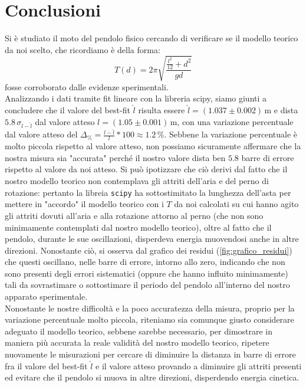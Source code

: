 \documentclass{article}
\begin{document}
\section{Conclusioni}
Si è studiato il moto del pendolo fisico cercando di verificare se il modello teorico da noi scelto, che ricordiamo è della forma:
$$
	T(d) = 2\pi\sqrt{\frac{\frac{l^2}{12} + d^2}{gd}}
$$
fosse corroborato dalle evidenze sperimentali. \\
Analizzando i dati tramite fit lineare con la libreria scipy, siamo giunti a concludere che il valore del best-fit $\hat{l}$ risulta essere $\hat{l} = (1.037 \pm 0.002) \, \text{m}$ e  dista $5.8 \, \sigma_{l - \hat{l}}$ dal valore atteso $l = (1.05 \pm 0.001) \, \text{m}$, con una variazione percentuale dal valore atteso del $\Delta_\% = \frac{l - \hat{l}}{l} * 100 \approx 1.2 \, \%$. Sebbene la variazione percentuale è molto piccola rispetto al valore atteso, non possiamo sicuramente affermare che la nostra misura sia "accurata" perché il nostro valore dista ben $5.8$ barre di errore rispetto al valore da noi atteso. Si può ipotizzare che ciò derivi dal fatto che il nostro modello teorico non contemplava gli attriti dell'aria e del perno di rotazione: pertanto la libreia \texttt{scipy} ha sottostimitato la lunghezza dell'asta per mettere in "accordo" il modello teorico con i $T$ da noi calcolati su cui hanno agito gli attriti dovuti all'aria e alla rotazione attorno al perno (che non sono minimamente contemplati dal nostro modello teorico), oltre al fatto che il pendolo, durante le sue oscillazioni, disperdeva energia muovendosi anche in altre direzioni. Nonostante ciò, si osserva dal grafico dei residui (\ref{fig:grafico_residui}) che questi oscillano, nelle barre di errore, intorno allo zero, indicando che non sono presenti degli errori sistematici (oppure che hanno influito minimamente) tali da sovrastimare o sottostimare il periodo del pendolo all'interno del nostro apparato sperimentale. \\
Nonostante le nostre difficoltà e la poco accuratezza della misura, proprio per la variazione percentuale molto piccola, riteniamo sia comunque giusto considerare adeguato il modello teorico, sebbene sarebbe necessario, per dimostrare in maniera più accurata la reale validità del nostro modello teorico, ripetere nuovamente le misurazioni per cercare di diminuire la distanza in barre di errore fra il valore del best-fit $\hat{l}$ e il valore atteso provando a diminuire gli attriti presenti ed evitare che il pendolo si muova in altre direzioni, disperdendo energia cinetica.
\end{document}
